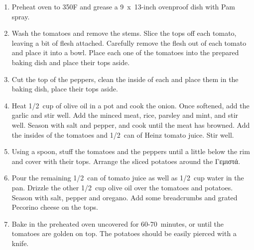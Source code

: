 \begin{enumerate}
    \item Preheat oven to 350\degree F and grease a 9~x~13-inch ovenproof dish with Pam spray.
    \item Wash the tomatoes and remove the stems. Slice the tops off each tomato, leaving a bit of flesh attached. Carefully remove the flesh out of each tomato and place it into a bowl. Place each one of the tomatoes into the prepared baking dish and place their tops aside.
    \item Cut the top of the peppers, clean the inside of each and place them in the baking dish, place their tops aside.
    \item Heat 1/2~cup of olive oil in a pot and cook the onion. Once softened, add the garlic and stir well. Add the minced meat, rice, parsley and mint, and stir well. Season with salt and pepper, and cook until the meat has browned. Add the insides of the tomatoes and 1/2~can of Heinz tomato juice. Stir well.
    \item Using a spoon, stuff the tomatoes and the peppers until a little below the rim and cover with their tops. Arrange the sliced potatoes around the \textgreek{Γεμιστά}.
    \item Pour the remaining 1/2~can of tomato juice as well as 1/2~cup water in the pan. Drizzle the other 1/2~cup olive oil over the tomatoes and potatoes. Season with salt, pepper and oregano. Add some breadcrumbs and grated Pecorino cheese on the tops.
    \item Bake in the preheated oven uncovered for 60-70~minutes, or until the tomatoes are golden on top. The potatoes should be easily pierced with a knife.
\end{enumerate}
